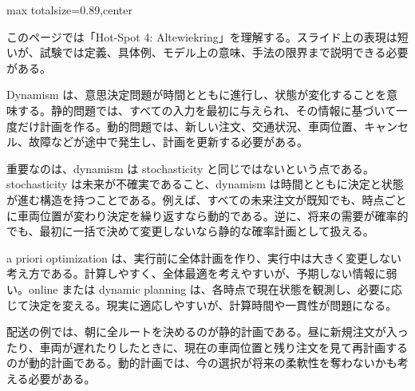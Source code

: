 \begin{minipage}[t]{0.58\textwidth}
\begin{adjustbox}{max totalsize={\textwidth}{0.89\textheight},center}
\begin{minipage}{\textwidth}\scriptsize
{}このページでは「Hot-Spot 4: Altewiekring」を理解する。スライド上の表現は短いが、試験では定義、具体例、モデル上の意味、手法の限界まで説明できる必要がある。\par
Dynamism は、意思決定問題が時間とともに進行し、状態が変化することを意味する。静的問題では、すべての入力を最初に与えられ、その情報に基づいて一度だけ計画を作る。動的問題では、新しい注文、交通状況、車両位置、キャンセル、故障などが途中で発生し、計画を更新する必要がある。\par
重要なのは、dynamism は stochasticity と同じではないという点である。stochasticity は未来が不確実であること、dynamism は時間とともに決定と状態が進む構造を持つことである。例えば、すべての未来注文が既知でも、時点ごとに車両位置が変わり決定を繰り返すなら動的である。逆に、将来の需要が確率的でも、最初に一括で決めて変更しないなら静的な確率計画として扱える。\par
a priori optimization は、実行前に全体計画を作り、実行中は大きく変更しない考え方である。計算しやすく、全体最適を考えやすいが、予期しない情報に弱い。online または dynamic planning は、各時点で現在状態を観測し、必要に応じて決定を変える。現実に適応しやすいが、計算時間や一貫性が問題になる。\par
配送の例では、朝に全ルートを決めるのが静的計画である。昼に新規注文が入ったり、車両が遅れたりしたときに、現在の車両位置と残り注文を見て再計画するのが動的計画である。動的計画では、今の選択が将来の柔軟性を奪わないかも考える必要がある。\par

\end{minipage}
\end{adjustbox}
\end{minipage}
